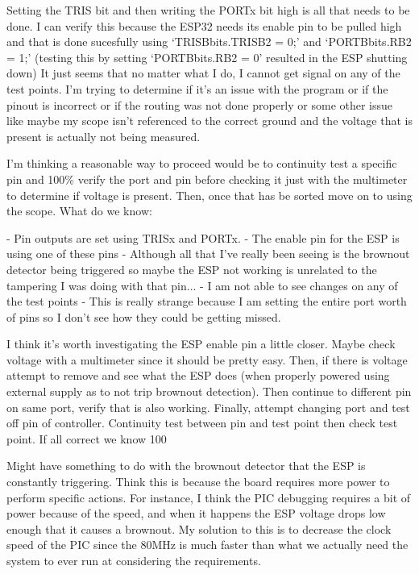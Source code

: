 Setting the TRIS bit and then writing the PORTx bit high is all that
needs to be done.
I can verify this because the ESP32 needs its enable pin to be pulled
high and that is done sucesfully using `TRISBbits.TRISB2 = 0;' and
`PORTBbits.RB2 = 1;'
(testing this by setting `PORTBbits.RB2 = 0' resulted in the ESP
shutting down)
It just seems that no matter what I do, I cannot get signal on any of
the test points. I'm trying to determine if it's an issue with the
program or if the pinout is incorrect or if the routing was not done
properly or some other issue like maybe my scope isn't referenced to
the correct ground and the voltage that is present is actually not
being measured.

I'm thinking a reasonable way to proceed would be to continuity test
a specific pin and 100\% verify the port and pin before checking it just
with the multimeter to determine if voltage is present. Then, once that
has be sorted move on to using the scope.
What do we know:

    - Pin outputs are set using TRISx and PORTx.
    - The enable pin for the ESP is using one of these pins
        - Although all that I've really been seeing
        is the brownout detector being triggered
        so maybe the ESP not working is unrelated to the
        tampering I was doing with that pin...
    - I am not able to see changes on any of the test points
        - This is really strange because I am setting the entire port
        worth of pins so I don't see how they could be getting missed.

I think it's worth investigating the ESP enable pin a little closer.
Maybe check voltage with a multimeter since it should be pretty easy.
Then, if there is voltage attempt to remove and see what the ESP does
(when properly powered using external supply as to not trip
brownout detection).
Then continue to different pin on same port, verify that is also working.
Finally, attempt changing port and test off pin of controller.
Continuity test between pin and test point then check test point.
If all correct we know 100%

Might have something to do with the brownout detector that the ESP is constantly triggering.
Think this is because the board requires more power to perform specific actions.
For instance, I think the PIC debugging requires a bit of power because of the speed,
and when it happens the ESP voltage drops low enough that it causes a brownout.
My solution to this is to decrease the clock speed of the PIC since the 80MHz is much
faster than what we actually need the system to ever run at considering the requirements.

